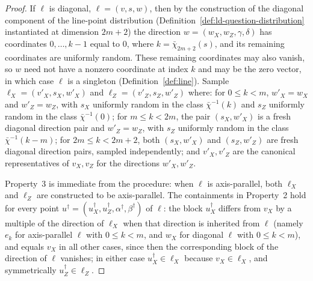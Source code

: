 \begin{proof}
	If $\ell$ is diagonal, $\ell = (v, s, w)$, then by the construction of
	the diagonal component of the line-point distribution
	(Definition~\ref{def:ld-question-distribution} instantiated at
	dimension $2m+2$) the direction $w = (w_X, w_Z, \gamma, \delta)$ has
	coordinates $0, \dots, k-1$ equal to $0$, where
	$k = \bar\chi_{2m+2}(s)$,
	and its remaining coordinates are uniformly random. These remaining
	coordinates may also vanish, so $w$ need not have a nonzero coordinate
	at index $k$ and may be the zero vector, in which case $\ell$ is a
	singleton (Definition~\ref{def:line}).
	Sample $\ell_X = (v'_X, s_X, w'_X)$ and $\ell_Z = (v'_Z, s_Z, w'_Z)$
	where: for $0 \le k < m$, $w'_X = w_X$ and $w'_Z = w_Z$, with $s_X$
	uniformly random in the class $\bar\chi^{-1}(k)$ and $s_Z$ uniformly
	random in the class $\bar\chi^{-1}(0)$; for $m \le k < 2m$, the pair
	$(s_X, w'_X)$ is a fresh diagonal direction pair and $w'_Z = w_Z$,
	with $s_Z$ uniformly random in the class $\bar\chi^{-1}(k-m)$; for
	$2m \le k < 2m+2$, both $(s_X, w'_X)$ and $(s_Z, w'_Z)$ are fresh
	diagonal direction pairs, sampled independently; and $v'_X, v'_Z$ are
	the canonical representatives of $v_X, v_Z$ for the directions
	$w'_X, w'_Z$.

	Property~3 is immediate from the procedure: when $\ell$ is
	axis-parallel, both $\ell_X$ and $\ell_Z$ are constructed to be
	axis-parallel. The containments in Property~2 hold for every point
	$u^\dagger = (u^\dagger_X, u^\dagger_Z, \alpha^\dagger,
	\beta^\dagger)$ of $\ell$: the block $u^\dagger_X$ differs from $v_X$
	by a multiple of the direction of $\ell_X$ when that direction is
	inherited from $\ell$ (namely $e_k$ for axis-parallel $\ell$ with
	$0 \le k < m$, and $w_X$ for diagonal $\ell$ with $0 \le k < m$),
	and equals $v_X$ in all other cases, since then the corresponding
	block of the direction of $\ell$ vanishes; in either case
	$u^\dagger_X \in \ell_X$ because $v_X \in \ell_X$, and symmetrically
	$u^\dagger_Z \in \ell_Z$.


\end{proof}
